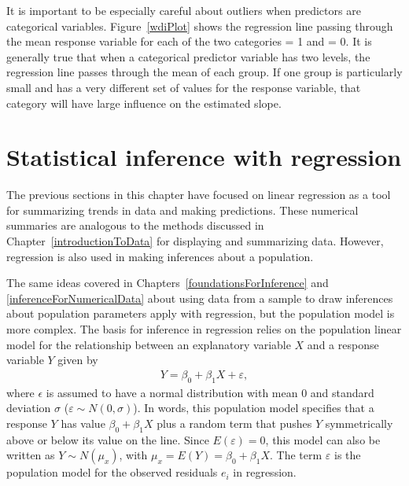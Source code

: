 It is important to be especially careful about outliers when predictors are categorical variables.  Figure~\ref{wdiPlot} shows the regression line passing through the mean response variable for each of the two categories  = 1 and  = 0. It is generally true that when a categorical predictor variable has two levels, the regression line passes through the mean of each group. If one group is particularly small and has a very different set of values for the response variable, that category will have large influence on the estimated slope.

\section{Statistical inference with regression}
\label{inferenceRegression}

The previous sections in this chapter have focused on linear regression as a tool for summarizing trends in data and making predictions. These numerical summaries are analogous to the methods discussed in Chapter~\ref{introductionToData} for displaying and summarizing data. However, regression is also used in making inferences about a population. 

The same ideas covered in Chapters~\ref{foundationsForInference} and \ref{inferenceForNumericalData} about using data from a sample to draw inferences about population parameters apply with regression, but the population model is more complex. The basis for inference in regression relies on the population linear model for the relationship between an explanatory variable $X$ and a response variable $Y$ given by
\begin{align}
Y = \beta_0 + \beta_1 X + \varepsilon,
\label{regressionPopulationModel}
\end{align}
where $\epsilon$ is assumed to have a normal distribution with mean 0 and standard deviation $\sigma$ ($\varepsilon \sim N(0, \sigma)$).  In words, this population model specifies that a response $Y$ has value $\beta_0 + \beta_1 X$ plus a random term that pushes $Y$ symmetrically above or below its value on the line. Since $E(\varepsilon) = 0$, this model can also be written as $Y\sim N(\mu_x)$, with $ \mu_x = E(Y) = \beta_0 + \beta_1 X$.  The term $\varepsilon$ is the population model for the observed residuals $e_i$ in regression. 

